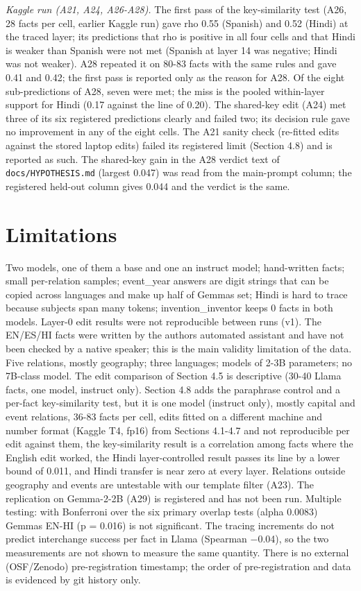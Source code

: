 \documentclass[11pt]{article}
\begin{document}
\emph{Kaggle run (A21, A24, A26-A28).} The first pass of the key-similarity test (A26, 28 facts per cell, earlier Kaggle run) gave rho 0.55 (Spanish) and 0.52 (Hindi) at the traced layer; its predictions that rho is positive in all four cells and that Hindi is weaker than Spanish were not met (Spanish at layer 14 was negative; Hindi was not weaker). A28 repeated it on 80-83 facts with the same rules and gave 0.41 and 0.42; the first pass is reported only as the reason for A28. Of the eight sub-predictions of A28, seven were met; the miss is the pooled within-layer support for Hindi (0.17 against the line of 0.20). The shared-key edit (A24) met three of its six registered predictions clearly and failed two; its decision rule gave no improvement in any of the eight cells. The A21 sanity check (re-fitted edits against the stored laptop edits) failed its registered limit (Section 4.8) and is reported as such. The shared-key gain in the A28 verdict text of \texttt{docs/HYPOTHESIS.md} (largest 0.047) was read from the main-prompt column; the registered held-out column gives 0.044 and the verdict is the same.

\section{Limitations}
Two models, one of them a base and one an instruct model; hand-written facts; small per-relation samples; event\_year answers are digit strings that can be copied across languages and make up half of Gemma\textquotesingle s set; Hindi is hard to trace because subjects span many tokens; invention\_inventor keeps 0 facts in both models. Layer-0 edit results were not reproducible between runs (v1). The EN/ES/HI facts were written by the authors\textquotesingle{} automated assistant and have not been checked by a native speaker; this is the main validity limitation of the data. Five relations, mostly geography; three languages; models of 2-3B parameters; no 7B-class model. The edit comparison of Section 4.5 is descriptive (30-40 Llama facts, one model, instruct only). Section 4.8 adds the paraphrase control and a per-fact key-similarity test, but it is one model (instruct only), mostly capital and event relations, 36-83 facts per cell, edits fitted on a different machine and number format (Kaggle T4, fp16) from Sections 4.1-4.7 and not reproducible per edit against them, the key-similarity result is a correlation among facts where the English edit worked, the Hindi layer-controlled result passes its line by a lower bound of 0.011, and Hindi transfer is near zero at every layer. Relations outside geography and events are untestable with our template filter (A23). The replication on Gemma-2-2B (A29) is registered and has not been run. Multiple testing: with Bonferroni over the six primary overlap tests (alpha 0.0083) Gemma\textquotesingle s EN-HI (p = 0.016) is not significant. The tracing increments do not predict interchange success per fact in Llama (Spearman −0.04), so the two measurements are not shown to measure the same quantity. There is no external (OSF/Zenodo) pre-registration timestamp; the order of pre-registration and data is evidenced by git history only.
\end{document}
